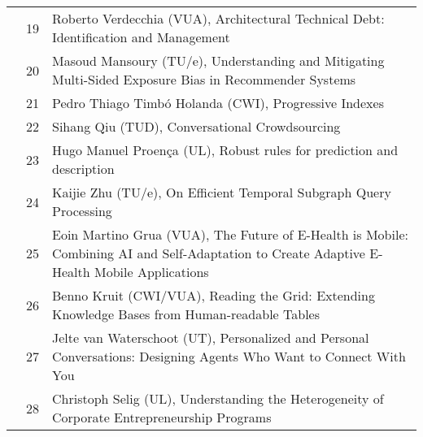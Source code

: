 \begin{xltabular}{\linewidth}{@{} l @{\hspace{0.5em}} l @{\hspace{1em}} X @{}}
	&	 19	&	 Roberto Verdecchia (VUA), Architectural Technical Debt: Identification and Management \\
	&	 20	&	 Masoud Mansoury (TU/e), Understanding and Mitigating Multi-Sided Exposure Bias in Recommender Systems \\
	&	 21	&	 Pedro Thiago Timb\'{o} Holanda (CWI), Progressive Indexes \\
	&	 22	&	 Sihang Qiu (TUD), Conversational Crowdsourcing \\
	&	 23	&	 Hugo Manuel Proen\c{c}a (UL), Robust rules for prediction and description \\
	&	 24	&	 Kaijie Zhu (TU/e), On Efficient Temporal Subgraph Query Processing \\
	&	 25	&	 Eoin Martino Grua (VUA), The Future of E-Health is Mobile: Combining AI and Self-Adaptation to Create Adaptive E-Health Mobile Applications \\
	&	 26	& 	 Benno Kruit (CWI/VUA), Reading the Grid: Extending Knowledge Bases from Human-readable Tables \\
	&	 27	&	 Jelte van Waterschoot (UT), Personalized and Personal Conversations: Designing Agents Who Want to Connect With You \\
	&	 28	&	 Christoph Selig (UL), Understanding the Heterogeneity of Corporate Entrepreneurship Programs \\


\end{xltabular}
